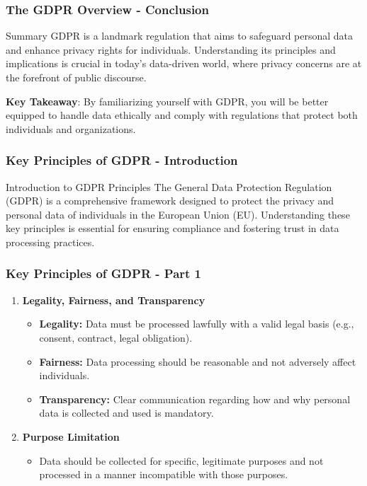 \documentclass[aspectratio=169]{beamer}
\begin{document}
\begin{frame}[fragile]
    \frametitle{The GDPR Overview - Conclusion}
    \begin{block}{Summary}
        GDPR is a landmark regulation that aims to safeguard personal data and enhance privacy rights for individuals. Understanding its principles and implications is crucial in today’s data-driven world, where privacy concerns are at the forefront of public discourse.
    \end{block}
    
    \textbf{Key Takeaway}:
    By familiarizing yourself with GDPR, you will be better equipped to handle data ethically and comply with regulations that protect both individuals and organizations.
\end{frame}

\begin{frame}[fragile]
    \frametitle{Key Principles of GDPR - Introduction}
    \begin{block}{Introduction to GDPR Principles}
        The General Data Protection Regulation (GDPR) is a comprehensive framework designed to protect the privacy and personal data of individuals in the European Union (EU). Understanding these key principles is essential for ensuring compliance and fostering trust in data processing practices.
    \end{block}
\end{frame}

\begin{frame}[fragile]
    \frametitle{Key Principles of GDPR - Part 1}
    \begin{enumerate}
        \item \textbf{Legality, Fairness, and Transparency}
        \begin{itemize}
            \item \textbf{Legality:} Data must be processed lawfully with a valid legal basis (e.g., consent, contract, legal obligation).
            \item \textbf{Fairness:} Data processing should be reasonable and not adversely affect individuals.
            \item \textbf{Transparency:} Clear communication regarding how and why personal data is collected and used is mandatory.
        \end{itemize}
        
        \item \textbf{Purpose Limitation}
        \begin{itemize}
            \item Data should be collected for specific, legitimate purposes and not processed in a manner incompatible with those purposes.
        \end{itemize}
    \end{enumerate}
\end{frame}
\end{document}
